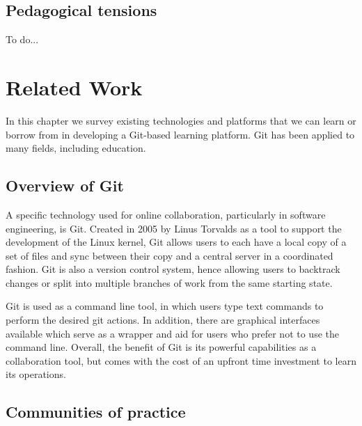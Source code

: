 \documentclass[12pt,twoside,vi]{mitthesis}
\newcommand{\wip}[1]{{\color{red} To do...}}
\begin{document}
\section{Pedagogical tensions}

\wip{overall course vs community.........

4 tensions content vs connection, individual pathway vs shared experience, solitary vs team, projects vs puzzles

for each tension, there are benefits to both sides, it's a matter of balancing the two

pedagogy and platform are closely linked but not causully linked

mastery->feedback, community}

\chapter{Related Work}

In this chapter we survey existing technologies and platforms that we can learn or borrow from in developing a Git-based learning platform. Git has been applied to many fields, including education. 

\section{Overview of Git}

A specific technology used for online collaboration, particularly in software engineering, is Git. Created in 2005 by Linus Torvalds as a tool to support the development of the Linux kernel, Git allows users to each have a local copy of a set of files and sync between their copy and a central server in a coordinated fashion. Git is also a version control system, hence allowing users to backtrack changes or split into multiple branches of work from the same starting state.

Git is used as a command line tool, in which users type text commands to perform the desired git actions. In addition, there are graphical interfaces available which serve as a wrapper and aid for users who prefer not to use the command line. Overall, the benefit of Git is its powerful capabilities as a collaboration tool, but comes with the cost of an upfront time investment to learn its operations.~\cite{githistory}

\section{Communities of practice}
\end{document}
